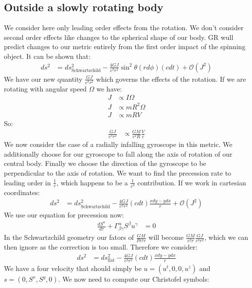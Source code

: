\subsection{Outside a slowly rotating body}
We consider here only leading order effects from the rotation. We don't consider second order effects like changes to the spherical shape of our body.
GR wull predict changes to our metric entirely from the first order impact of the spinning object.
It can be shown that:
\begin{align*}
	ds^2 &= ds_\text{Schwartzchild}^2 - \frac{4G J}{c^3 r^2} \sin^2\theta (rd\phi)(cdt) + \mathcal{O}(J^2)
\end{align*}
We have our new quantity $\frac{GJ}{c^3 r^2}$ which governs the effects of the rotation. If we are rotating with angular speed $\Omega$ we have:
\begin{align*}
	J &\propto I\Omega \\
	J &\propto mR^2\Omega \\
	J &\propto mRV
\end{align*}
So:
\begin{align*}
	\frac{GJ}{c^3 r^2} &\propto \frac{GM}{c^2 R} \frac{V}{c}
\end{align*}
We now consider the case of a radially infalling gyroscope in this metric. We additionally choose for our gyroscope to fall along the axis of rotation of our central body.
Finally we choose the direction of the gyroscope to be perpendicular to the axis of rotation.
We want to find the precession rate to leading order in $\frac{1}{c}$, which happens to be a $\frac{1}{c^3}$ contribution.
If we work in cartesian coordinates:
\begin{align*}
	ds^2 &= ds_\text{Schwartzchild}^2 - \frac{4G J}{c^3 r^2} (cdt) \frac{xdy - ydx}{r} + \mathcal{O}(J^2)
\end{align*}
We use our equation for precession now:
\begin{align*}
	\frac{dS^\alpha}{d\tau} + \Gamma^\alpha_{\beta\gamma} S^\beta u^\gamma &= 0
\end{align*}
In the Schwartzchild geometry our fators of $\frac{GM}{Pc^2r}$ will become $\frac{GM}{c^2 r} \frac{GJ}{c^3 r^2}$, which we can then ignore as the correction is too small.
Therefore we consider:
\begin{align*}
	ds^2 &= ds_\text{flat}^2 - \frac{4GJ}{c^3 r^2} (cdt) \frac{xdy - ydx}{r}
\end{align*}
We have a four velocity that should simply be $u = (u^t,0,0,u^z)$ and $s = (0,S^x,S^y,0)$.
We now need to compute our Christofel symbols:
